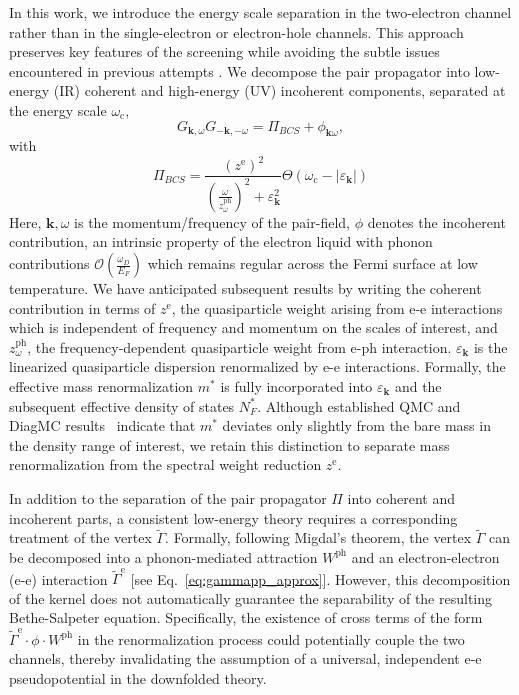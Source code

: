 \documentclass[%
 reprint,
superscriptaddress,
 amsmath,amssymb,
 aps,
prx,
]{revtex4-2}
\newcommand{\change}[2]{{\sout{#1} {\color{orange} {#2}}}}
\newcommand{\bk}{\mathbf{k}}
\newcommand{\Gammapp}{\tilde{\Gamma}}
\newcommand{\txc}{\text{c}}
\newcommand{\txe}{\text{e}}
\newcommand{\txph}{\text{ph}}
\begin{document}
In this work, we introduce 
the energy scale separation in the two-electron channel rather than in the single-electron or electron-hole channels. This approach preserves key features of the screening while avoiding the subtle issues encountered in previous attempts \cite{RAINER1986371,Shankar94}. We decompose the pair propagator into low-energy (IR) coherent and high-energy (UV) incoherent components, separated at the energy scale $\omega_\txc$,
\begin{equation}
\label{eq:separation}
G_{\mathbf{k}, \omega}G_{-\mathbf{k}, -\omega} = \Pi_{BCS} +\phi_{\mathbf{k}\omega},
\end{equation}
with
\begin{equation}
\Pi_{BCS}=\frac{\left(z^{\mathrm{e}}\right)^2}{\left(\frac{\omega}{z_\omega^{\mathrm{ph}}}\right)^2+\varepsilon_{\mathbf{k}}^2} \Theta\left(\omega_{\mathrm{c}}-\left|\varepsilon_{\mathbf{k}}\right|\right)
\label{eq:PiBCS}
\end{equation} 
Here, $\mathbf{k},\omega$ is the momentum/frequency of the pair-field, $\phi$ denotes the incoherent contribution, an intrinsic property of the electron liquid with phonon contributions $\mathcal{O}\left(\frac{\omega_D}{E_F}\right)$ which remains regular across the Fermi surface at low temperature.
We have anticipated subsequent results by writing the coherent contribution in terms of $z^\txe$, the quasiparticle weight arising from e-e interactions which is independent of frequency and momentum on the scales of interest, and $z_\omega^\txph$, the frequency-dependent quasiparticle weight from e-ph interaction.
{$\varepsilon_{\mathbf{k}}$ is the linearized quasiparticle dispersion renormalized by e-e interactions.}
{Formally, the effective mass renormalization $m^*$ is fully incorporated into $\varepsilon_{\mathbf{k}}$ and the subsequent effective density of states $N_F^*$. Although established QMC and DiagMC results~\cite{hauleSingleparticleExcitationsUniform2022,holzmannStaticSelfEnergyEffective2023a} indicate that $m^*$ deviates only slightly from the bare mass in the density range of interest, we retain this distinction to separate mass renormalization from the spectral weight reduction $z^\txe$.}

In addition to the separation of the pair propagator $\Pi$ into coherent and incoherent parts, a consistent low-energy theory requires a corresponding treatment of the vertex $\Gammapp$. Formally, following Migdal's theorem, the vertex $\Gammapp$ can be decomposed into a phonon-mediated attraction $W^{\text{ph}}$ and an electron-electron (e-e) interaction $\tilde{\Gamma}^{\text{e}}$ [see Eq.~\eqref{eq:gammapp_approx}]. However, this decomposition of the kernel does not automatically guarantee the separability of the resulting Bethe-Salpeter equation. Specifically, the existence of cross terms of the form $\tilde{\Gamma}^{\text{e}}\cdot \phi \cdot W^{\text{ph}}$ in the renormalization process could potentially couple the two channels, thereby invalidating the assumption of a universal, independent e-e pseudopotential in the downfolded theory.
\end{document}
